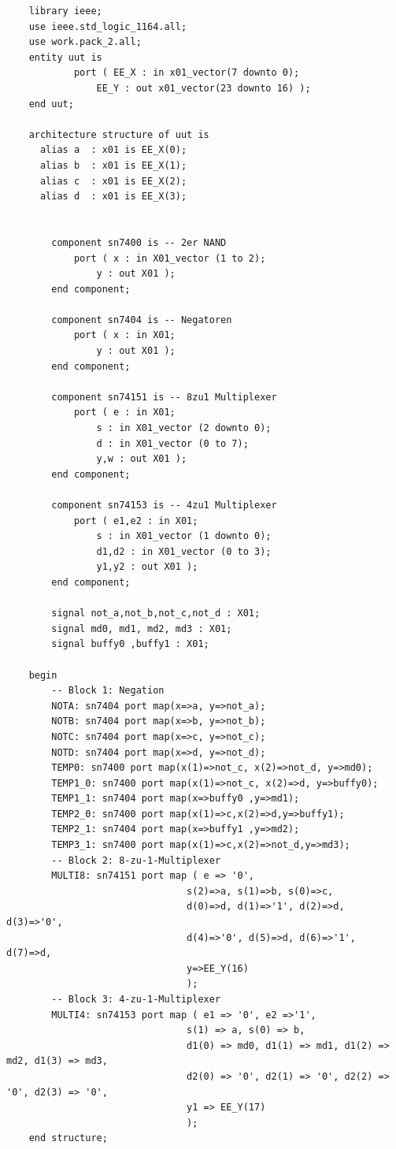 \documentclass[fleqn]{article}
\begin{document}
\begin{lstlisting}
    library ieee; 
    use ieee.std_logic_1164.all; 
    use work.pack_2.all;
    entity uut is 
            port ( EE_X : in x01_vector(7 downto 0); 
                EE_Y : out x01_vector(23 downto 16) ); 
    end uut;
    
    architecture structure of uut is
      alias a  : x01 is EE_X(0);
      alias b  : x01 is EE_X(1);
      alias c  : x01 is EE_X(2);
      alias d  : x01 is EE_X(3);
    
    
        component sn7400 is -- 2er NAND 
            port ( x : in X01_vector (1 to 2); 
                y : out X01 ); 
        end component;
    
        component sn7404 is -- Negatoren 
            port ( x : in X01; 
                y : out X01 ); 
        end component;
    
        component sn74151 is -- 8zu1 Multiplexer 
            port ( e : in X01; 
                s : in X01_vector (2 downto 0); 
                d : in X01_vector (0 to 7); 
                y,w : out X01 ); 
        end component;
        
        component sn74153 is -- 4zu1 Multiplexer 
            port ( e1,e2 : in X01; 
                s : in X01_vector (1 downto 0); 
                d1,d2 : in X01_vector (0 to 3); 
                y1,y2 : out X01 );
        end component;
    
        signal not_a,not_b,not_c,not_d : X01; 
        signal md0, md1, md2, md3 : X01; 
        signal buffy0 ,buffy1 : X01;
    
    begin
        -- Block 1: Negation
        NOTA: sn7404 port map(x=>a, y=>not_a);
        NOTB: sn7404 port map(x=>b, y=>not_b); 
        NOTC: sn7404 port map(x=>c, y=>not_c); 
        NOTD: sn7404 port map(x=>d, y=>not_d);
        TEMP0: sn7400 port map(x(1)=>not_c, x(2)=>not_d, y=>md0); 
        TEMP1_0: sn7400 port map(x(1)=>not_c, x(2)=>d, y=>buffy0); 
        TEMP1_1: sn7404 port map(x=>buffy0 ,y=>md1);
        TEMP2_0: sn7400 port map(x(1)=>c,x(2)=>d,y=>buffy1);
        TEMP2_1: sn7404 port map(x=>buffy1 ,y=>md2);
        TEMP3_1: sn7400 port map(x(1)=>c,x(2)=>not_d,y=>md3);
        -- Block 2: 8-zu-1-Multiplexer
        MULTI8: sn74151 port map ( e => '0',
                                s(2)=>a, s(1)=>b, s(0)=>c,
                                d(0)=>d, d(1)=>'1', d(2)=>d, d(3)=>'0', 
                                d(4)=>'0', d(5)=>d, d(6)=>'1', d(7)=>d,
                                y=>EE_Y(16)
                                );
        -- Block 3: 4-zu-1-Multiplexer
        MULTI4: sn74153 port map ( e1 => '0', e2 =>'1',
                                s(1) => a, s(0) => b,
                                d1(0) => md0, d1(1) => md1, d1(2) => md2, d1(3) => md3,
                                d2(0) => '0', d2(1) => '0', d2(2) => '0', d2(3) => '0',
                                y1 => EE_Y(17)
                                );
    end structure;

\end{lstlisting}
\end{document}

